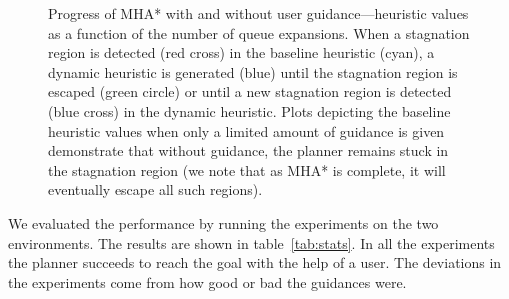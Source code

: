 \documentclass{article}
\begin{document}
\begin{figure}[t]%
  \centering%
%

  \caption{%
    Progress of MHA* with and without user guidance---heuristic values as a function of the number of queue expansions.
		When a stagnation region is detected (red cross) in the baseline heuristic (cyan), a dynamic heuristic is generated (blue) until the stagnation region is escaped (green circle) or until a new stagnation region is detected (blue cross) in the dynamic heuristic.
		Plots depicting the baseline heuristic values when only a limited amount of guidance is given demonstrate that without guidance, the planner remains stuck in the stagnation region (we note that as MHA* is complete, it will eventually escape all such regions).}


  \label{fig:h_plot}%

  \vspace{-4.5mm}

\end{figure}

We evaluated the performance by running the experiments on the two environments. The results are shown in table~\ref{tab:stats}. In all the experiments the planner succeeds to reach the goal with the help of a user. The deviations in the experiments come from how good or bad the guidances were.
\end{document}
